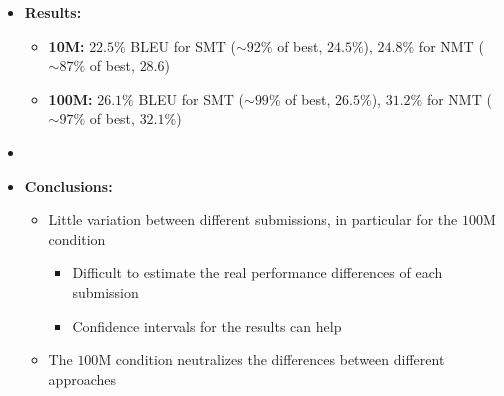 \documentclass[a0]{sciposter}
\begin{document}
\begin{multicols*}{2}
\begin{itemize}
  \item {\bf Results:}
  \begin{itemize}
    \item {\bf 10M:} $22.5\%$ BLEU for SMT ($\sim92\%$ of best, $24.5\%$), $24.8\%$ for NMT ($\sim87\%$ of best, $28.6$)
    \item {\bf 100M:} $26.1\%$ BLEU for SMT ($\sim99\%$ of best, $26.5\%$), $31.2\%$ for NMT ($\sim97\%$ of best, $32.1\%$)
  \end{itemize} 
  \item[~]
  \item {\bf Conclusions:}
  \begin{itemize}
    \item Little variation between different submissions, in particular for the $100$M condition
    \begin{itemize}
      \item Difficult to estimate the real performance differences of each submission
      \item Confidence intervals for the results can help
    \end{itemize}
    \item The $100$M condition %
    neutralizes the differences between different approaches
  \end{itemize}
\end{itemize}




\end{multicols*}
\end{document}
